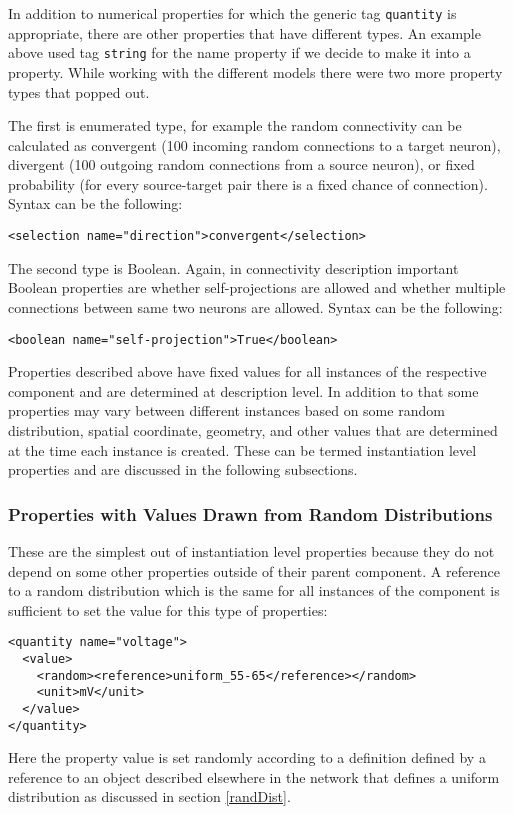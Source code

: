 \documentclass{article}
\begin{document}
In addition to numerical properties for which the generic tag {\tt quantity}
is appropriate, there are other properties that have different types. An example
above used tag {\tt string} for the name property if we decide to make it into
a property. While working with the different models there were two more property
types that popped out.

The first is enumerated type, for example the random
connectivity can be calculated as convergent (100 incoming random connections
to a target neuron), divergent (100 outgoing random connections from a source
neuron), or fixed probability (for every source-target pair there is a fixed
chance of connection). Syntax can be the following:
\begin{verbatim}
<selection name="direction">convergent</selection>
\end{verbatim}

The second type is Boolean. Again, in connectivity description important
Boolean properties are whether self-projections are allowed and whether
multiple connections between same two neurons are allowed. Syntax can be the
following:
\begin{verbatim}
<boolean name="self-projection">True</boolean>
\end{verbatim}

Properties described above have fixed values for all instances of the
respective component and are determined at description level. In addition to that
some properties may vary between different instances based on some random
distribution, spatial coordinate, geometry, and other values that are
determined at the time each instance is created. These can be termed
instantiation level properties and are discussed in the following
subsections.

\subsubsection{Properties with Values Drawn from Random Distributions}
\label{randProp}

These are the simplest out of instantiation level properties because
they do not depend on some other properties outside of their parent component.
A reference to a random distribution which is the same for all instances
of the component is sufficient to set the value for this type of properties:
\begin{verbatim}
<quantity name="voltage">
  <value>
    <random><reference>uniform_55-65</reference></random>
    <unit>mV</unit>
  </value>
</quantity>
\end{verbatim}
Here the property value is set randomly according to a definition defined by a
reference to an object described elsewhere in the network that defines a uniform
distribution as discussed in section \ref{randDist}.
\end{document}
